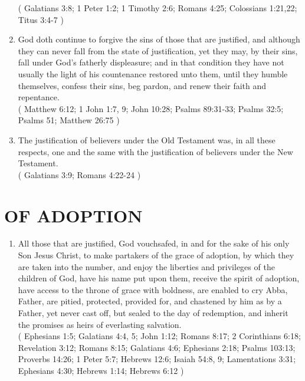 \documentclass[12pt,a4paper]{book}
\begin{document}
\begin{enumerate}
( Galatians 3:8; 1 Peter 1:2; 1 Timothy 2:6; Romans 4:25; Colossians 1:21,22; Titus 3:4-7 )
\item God doth continue to forgive the sins of those that are justified, and although they can never fall from the state of justification, yet they may, by their sins, fall under God's fatherly displeasure; and in that condition they have not usually the light of his countenance restored unto them, until they humble themselves, confess their sins, beg pardon, and renew their faith and repentance.\\
( Matthew 6:12; 1 John 1:7, 9; John 10:28; Psalms 89:31-33; Psalms 32:5; Psalms 51; Matthew 26:75 )
\item The justification of believers under the Old Testament was, in all these respects, one and the same with the justification of believers under the New Testament.\\
( Galatians 3:9; Romans 4:22-24 )
\end{enumerate}

\chapter{OF ADOPTION}
\label{ch-adop}
\begin{enumerate}
\item All those that are justified, God vouchsafed, in and for the sake of his only Son Jesus Christ, to make partakers of the grace of adoption, by which they are taken into the number, and enjoy the liberties and privileges of the children of God, have his name put upon them, receive the spirit of adoption, have access to the throne of grace with boldness, are enabled to cry Abba, Father, are pitied, protected, provided for, and chastened by him as by a Father, yet never cast off, but sealed to the day of redemption, and inherit the promises as heirs of everlasting salvation.\\
( Ephesians 1:5; Galatians 4:4, 5; John 1:12; Romans 8:17; 2 Corinthians 6:18; Revelation 3:12; Romans 8:15; Galatians 4:6; Ephesians 2:18; Psalms 103:13; Proverbs 14:26; 1 Peter 5:7; Hebrews 12:6; Isaiah 54:8, 9; Lamentations 3:31; Ephesians 4:30; Hebrews 1:14; Hebrews 6:12 )
\end{enumerate}
\end{document}
